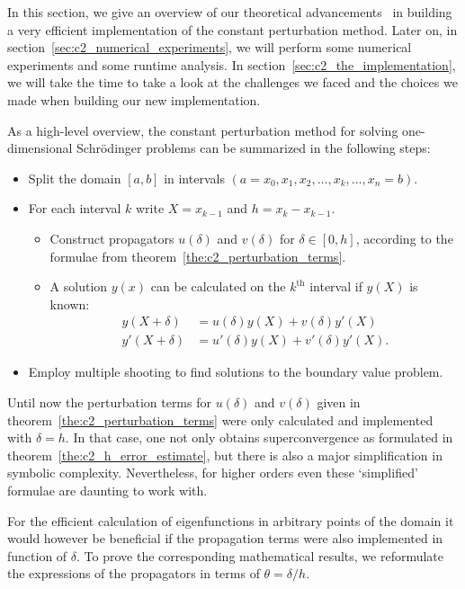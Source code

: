 In this section, we give an overview of our theoretical advancements~\cite{baeyens_fast_2020} in building a very efficient implementation of the constant perturbation method. Later on, in section~\ref{sec:c2_numerical_experiments}, we will perform some numerical experiments and some runtime analysis. In section~\ref{sec:c2_the_implementation}, we will take the time to take a look at the challenges we faced and the choices we made when building our new implementation.

As a high-level overview, the constant perturbation method for solving one-dimensional Schrödinger problems can be summarized in the following steps:
\begin{itemize}
    \item Split the domain $[a, b]$ in intervals $(a=x_0, x_1, x_2, \dots, x_k, \dots, x_n = b)$.
    \item For each interval $k$ write $X = x_{k-1}$ and $h = x_k - x_{k-1}$. \begin{itemize}
              \item Construct propagators $u(\delta)$ and $v(\delta)$ for $\delta \in [0, h]$, according to the formulae from theorem~\ref{the:c2_perturbation_terms}.
              \item A solution $y(x)$ can be calculated on the $k^\text{th}$ interval if $y(X)$ is known:
                    \begin{align*}
                        y(X+\delta)  & = u(\delta)y(X) + v(\delta)y'(X)           \\
                        y'(X+\delta) & = u'(\delta)y(X) + v'(\delta)y'(X)\text{.}
                    \end{align*}
          \end{itemize}
    \item Employ multiple shooting to find solutions to the boundary value problem.
\end{itemize}

Until now the perturbation terms for $u(\delta)$ and $v(\delta)$ given in theorem~\ref{the:c2_perturbation_terms} were only calculated and implemented with $\delta = h$. In that case, one not only obtains superconvergence as formulated in theorem~\ref{the:c2_h_error_estimate}, but there is also a major simplification in symbolic complexity. Nevertheless, for higher orders even these `simplified' formulae are daunting to work with.

For the efficient calculation of eigenfunctions in arbitrary points of the domain it would however be beneficial if the propagation terms were also implemented in function of $\delta$. To prove the corresponding mathematical results, we reformulate the expressions of the propagators in terms of $\theta=\delta/h$.


